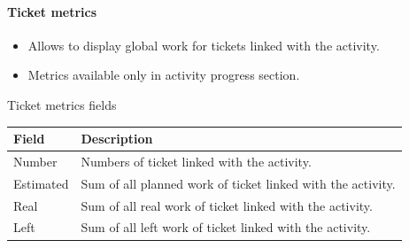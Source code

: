 \documentclass[letterpaper,10pt,english]{sphinxmanual}
\begin{document}
\paragraph{Ticket metrics}
\begin{itemize}
\item {} 
Allows to display global work for tickets linked with the activity.

\item {} 
Metrics available only in activity progress section.

\end{itemize}


\begin{threeparttable}
\capstart\caption{Ticket metrics fields}
\label{PlanningElements:id6}
\begin{tabulary}{\linewidth}{|l|l|}
\hline
\textsf{\relax 
Field
} & \textsf{\relax 
Description
}\\
\hline
Number
 & 
Numbers of ticket linked with the activity.
\\
\hline
Estimated
 & 
Sum of all planned work of ticket linked with the activity.
\\
\hline
Real
 & 
Sum of all real work of ticket linked with the activity.
\\
\hline
Left
 & 
Sum of all left work of ticket linked with the activity.
\\
\hline\end{tabulary}

\end{threeparttable}
\end{document}
